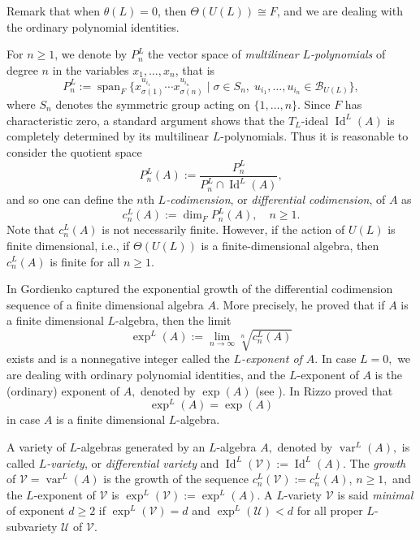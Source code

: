 \documentclass[a4paper,reqno]{amsart}
\theoremstyle{definition}
\numberwithin{equation}{section}
\numberwithin{theorem}{section}
\DeclareMathOperator{\I}{Id}
\DeclareMathOperator{\V}{var}
\DeclareMathOperator{\spn}{span}
\begin{document}
Remark that when $\theta(L)=0$, then $\Theta(U(L))\cong F$, and we are dealing with the ordinary polynomial identities.

\smallskip

For $n\geq 1$, we denote by $P_n^L$ the vector space of \emph{multilinear $L$-polynomials} of degree $n$ in the variables $x_{1},\dots,x_{n}$, that is
	$$
	P_n^L:=\spn_F\{x_{\sigma(1)}^{u_{i_1}}\cdots x_{\sigma(n)}^{u_{i_n}} \mid  \sigma\in S_{n} ,\; u_{i_1},\ldots,u_{i_n}\in \mathcal{B}_{U(L)} \},
	$$
	where $S_n$ denotes the symmetric group acting on $\{1,\ldots,n\}$.
	Since $F$ has characteristic zero, a standard argument shows that the $T_L$-ideal $\I^L(A)$ is completely determined by its multilinear  $L$-polynomials. %
	Thus it is reasonable to consider the quotient space
	$$
	P_n^L(A):= \dfrac{P_n^L}{P_n^L \cap \I^L(A)},
	$$
    and so one can define the $n$th \emph{$L$-codimension}, or \emph{differential codimension}, of $A$ as
    $$
    c_n^L(A):=\dim_F P_n^L(A), \quad n\geq 1.
    $$
 Note that $c_n^L(A)$ is not necessarily finite. However, if the action of $U(L)$ is finite dimensional, i.e., if $\Theta(U(L))$ is a finite-dimensional algebra, then $c_n^L(A)$ is finite for all $n \geq 1.$
 
 In \cite{Gordienko2013} Gordienko captured the exponential growth of the differential codimension sequence of a finite dimensional algebra  $A.$ More precisely, he proved that if $A$ is a finite dimensional $L$-algebra, then the limit 
$$
\exp^L(A):=\lim_{n\to \infty}\sqrt[n]{c_n^L(A)}
$$ 
exists and is a nonnegative integer called the \emph{$L$-exponent of $A$}.
In case $L=0,$ we are dealing with ordinary polynomial identities, and the $L$-exponent of $A$ is the (ordinary) exponent of $A,$ denoted by $\exp(A)$ (see \cite[Chapter 6]{GiambrunoZaicevbook}). 
In \cite{Rizzo2023} Rizzo proved that
\begin{equation}\label{exponent}
    \exp^L(A)=\exp(A)
\end{equation}
in case $A$ is a finite dimensional $L$-algebra.

\smallskip




A variety of $L$-algebras generated by an $L$-algebra $A,$ denoted by $\V^L(A),$  is called {\em $L$-variety}, or {\em differential variety} and $\I^L(\mathcal{V}):=\I^L(A)$. The {\em growth} of $\mathcal{V}= \V^L(A)$ is the growth of the sequence $c^L_{n}(\mathcal{V}):=c^L_{n}(A)$, $n\geq 1,$ and the $L$-exponent of $\mathcal{V}$ is $\exp^L(\mathcal{V}):=\exp^L(A).$ A $L$-variety $ \mathcal{V}$ is said \emph{minimal} of exponent $d\geq 2$ if $\exp^L(\mathcal{V})=d$ and $\exp^L(\mathcal{U})<d$ for all proper $L$-subvariety $\mathcal{U}$ of $\mathcal{V}$.
\end{document}

